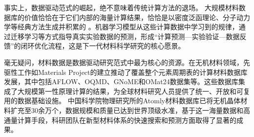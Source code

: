事实上，数据驱动范式的崛起，绝不意味着传统计算方法的退场。
大规模材料数据库的价值恰恰在于它们内部的海量计算结果，恰恰是以密度泛函理论、分子动力学等经典方法生成并积累的
。机器学习模型从这些计算数据中学习到的规律，通过迁移学习等方式指导真实实验数据的预测，形成“计算预测—实验验证—数据反馈”的闭环优化流程，这是下一代材料科学研究的核心愿景。

毫无疑问，材料数据是数据驱动研究范式中最为核心的资源。在无机材料领域，先驱性工作如\textrm{Materials Project}的建立推动了覆盖整个元素周期表的计算材料数据库发展，其中包括\textrm{AFLOW}、\textrm{OQMD}、\textrm{GNoME}和\textrm{OMat24}数据集等。这些数据库集成了大规模第一性原理计算的结果，为全球材料研究人员提供了统一、开放和可复用的数据基础设施。
中国科学院物理研究所的\textrm{Atomly}材料数据库已将无机晶体材料扩充至30余万个，数据规模和质量已达到世界顶级水准，基于这一海量数据和高通量计算手段，科研团队在新型材料体系的快速搜索和预测方面取得了显著的成果。%

